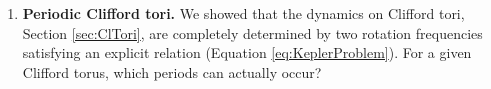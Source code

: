 \documentclass{article}
\begin{document}
\begin{enumerate}
    \item \textbf{Periodic Clifford tori.} We showed that the dynamics on Clifford tori, Section \ref{sec:ClTori}, are completely determined by two rotation frequencies satisfying an explicit relation (Equation \eqref{eq:KeplerProblem}). %
    For a given Clifford torus, which periods can actually occur? %
\end{enumerate}
\end{document}

